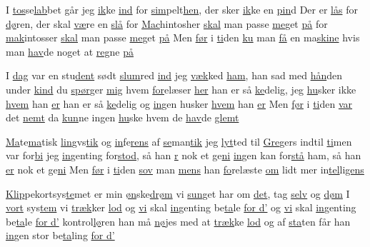 \documentclass[a4paper,11pt]{article}
\begin{document}
\begin{song}
%
I \underline{tos}se\underline{lab}bet går jeg \underline{ik}ke \underline{ind}
for \underline{sim}pelt\underline{hen}, der sker \underline{ik}ke en \underline{pin}d
%
Der er \underline{lås} for \underline{dø}ren, der skal \underline{væ}re en \underline{slå}
for \underline{Mac}hintosher \underline{skal} man passe \underline{me}get \underline{på}
 for \underline{mak}intosser \underline{skal} man passe \underline{me}get \underline{på}
%
Men \underline{før} i \underline{ti}den \underline{ku} man \underline{få}
en ma\underline{skine} hvis man \underline{hav}de noget at \underline{reg}ne \underline{på}
 

%
I \underline{dag} var en stu\underline{dent} sødt \underline{slum}red \underline{ind}
jeg \underline{væk}ked \underline{ham}, han sad med \underline{hån}den under \underline{kind}
%
du \underline{spør}ger \underline{mig} hvem \underline{for}elæser \underline{her}
han er så \underline{ke}delig, jeg \underline{hu}sker ikke \underline{hvem} han \underline{er}
 han er så \underline{ke}delig og \underline{in}gen husker \underline{hvem} han \underline{er}
%
Men \underline{før} i \underline{ti}den \underline{var} det \underline{nemt}
da \underline{kun}ne ingen \underline{hu}ske hvem de \underline{hav}de \underline{glemt}
 

%
\underline{Ma}te\underline{ma}tisk \underline{lin}gvs\underline{tik}
og \underline{in}fe\underline{rens} af \underline{se}man\underline{tik}
%
jeg \underline{lyt}ted til \underline{Gre}gers indtil \underline{ti}men var for\underline{bi}
jeg \underline{in}genting for\underline{stod}, så han \underline{\underline{r}} nok et ge\underline{ni}
 \underline{in}gen kan for\underline{stå} ham, så han \underline{er} nok et ge\underline{ni}
%
Men \underline{før} i \underline{ti}den \underline{sov} man \underline{mens}
han \underline{fo}relæste \underline{om} lidt mer in\underline{tel}li\underline{gens}
 

%
\underline{Klip}pekortsys\underline{te}met er min \underline{øn}ske\underline{drøm}
vi \underline{sun}get har om \underline{det}, tag \underline{selv} og \underline{døm}
%
I \underline{vort} sys\underline{tem} vi \underline{træk}ker \underline{lod}
og \underline{vi} skal \underline{in}genting be\underline{ta}le \underline{for d'}
 og \underline{vi} skal \underline{in}genting be\underline{ta}le \underline{for d'}
%
kontrol\underline{lø}ren han må \underline{nø}jes med at \underline{træk}ke \underline{lod}
og af \underline{sta}ten får han \underline{in}gen stor be\underline{ta}ling \underline{for d'}
 
\end{song}
\end{document}
